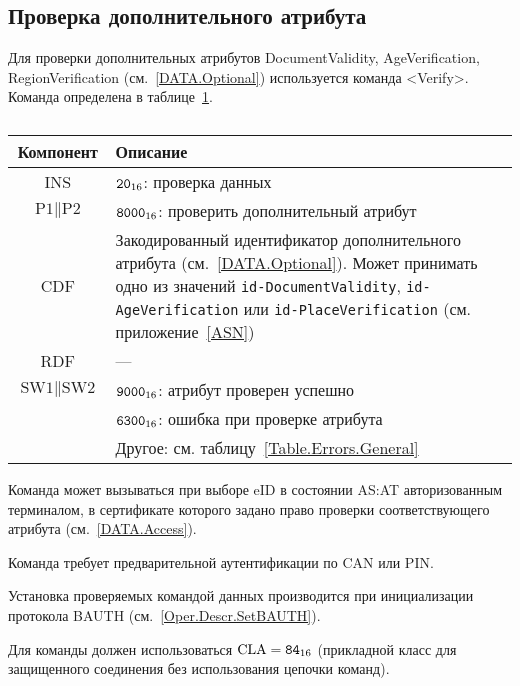 \subsection{Проверка дополнительного атрибута}
\label{Oper.Descr.VerifyData}

Для проверки дополнительных атрибутов DocumentValidity, AgeVerification, 
RegionVerification (см.~\ref{DATA.Optional}) используется команда  <Verify>. 
Команда определена в таблице~\ref{Table.Oper.VerifyDataCmd}.

\begin{table}[hbt]
\caption{}\label{Table.Oper.VerifyDataCmd}
\begin{tabular}{|c|p{14cm}|}
\hline
Компонент & Описание \\
\hline
\hline
INS & $\texttt{20}_{16}$: проверка данных\\
\hline
$\text{P1} \parallel \text{P2}$ & $\texttt{8000}_{16}$: 
проверить дополнительный атрибут\\
\hline
CDF & Закодированный идентификатор дополнительного атрибута 
(см.~\ref{DATA.Optional}). 
Может принимать одно из значений 
\verb|id-DocumentValidity|, \verb|id-AgeVerification| или \verb|id-PlaceVerification| 
(см. приложение~\ref{ASN})\\
\hline 
\hline
RDF &  --- \\
\hline
$\text{SW1} \parallel \text{SW2}$ & $\texttt{9000}_{16}$: атрибут проверен успешно\\
\cline{2-2}
 & $\texttt{6300}_{16}$: ошибка при проверке атрибута\\
\cline{2-2}
 & Другое: см. таблицу~\ref{Table.Errors.General} \\
\hline
\end{tabular}
\end{table}

Команда может вызываться при выборе eID в состоянии AS:AT
авторизованным терминалом, в сертификате которого задано право
проверки соответствующего атрибута (см.~\ref{DATA.Access}).  

Команда требует предварительной аутентификации по CAN или PIN.

Установка проверяемых командой данных производится 
при инициализации протокола BAUTH (см.~\ref{Oper.Descr.SetBAUTH}).  

Для команды должен использоваться $\text{CLA}=\texttt{84}_{16}$ 
(прикладной класс для защищенного соединения без использования цепочки 
команд). 


